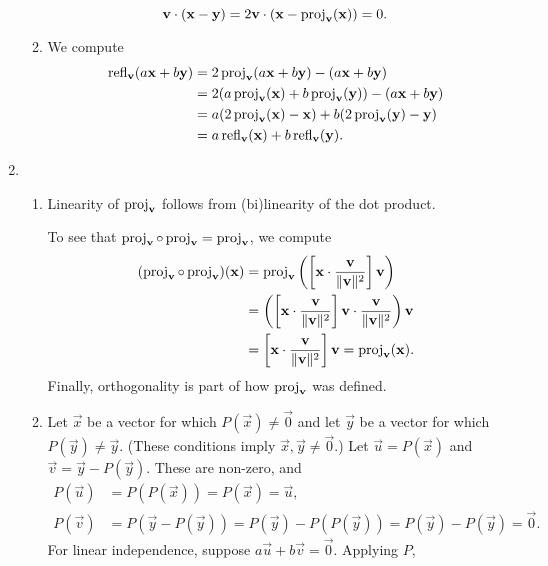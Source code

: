 \begin{enumerate}
\begin{enumerate}
\begin{equation*}
\mathbf{v}\cdot (\mathbf{x} - \mathbf{y}) = 2\mathbf{v}\cdot (\mathbf{x} - \operatorname{proj}_{\mathbf{v}}(\mathbf{x})) = 0.
\end{equation*}
\item We compute
\begin{align*}
\operatorname{refl}_{\mathbf{v}}(a\mathbf{x} + b\mathbf{y}) &= 2\operatorname{proj}_{\mathbf{v}}(a\mathbf{x} + b\mathbf{y}) - (a\mathbf{x} + b\mathbf{y}) \\
&= 2(a\operatorname{proj}_{\mathbf{v}}(\mathbf{x}) + b\operatorname{proj}_{\mathbf{v}}(\mathbf{y})) - (a\mathbf{x} + b\mathbf{y}) \\
&= a(2\operatorname{proj}_{\mathbf{v}}(\mathbf{x}) - \mathbf{x}) + b(2\operatorname{proj}_{\mathbf{v}}(\mathbf{y}) - \mathbf{y}) \\
&= a\operatorname{refl}_{\mathbf{v}}(\mathbf{x}) + b\operatorname{refl}_{\mathbf{v}}(\mathbf{y}).
\end{align*}
\end{enumerate}
\item \begin{enumerate}
\item Linearity of $\operatorname{proj}_{\mathbf{v}}$ follows from (bi)linearity of the dot product.\par
To see that $\operatorname{proj}_{\mathbf{v}}\circ\operatorname{proj}_{\mathbf{v}} = \operatorname{proj}_{\mathbf{v}}$, we compute
\begin{align*}
(\operatorname{proj}_{\mathbf{v}}\circ\operatorname{proj}_{\mathbf{v}})(\mathbf{x}) &= \operatorname{proj}_{\mathbf{v}}\left(\left[\mathbf{x}\cdot\frac{\mathbf{v}}{\|\mathbf{v}\|^2}\right]\mathbf{v}\right) \\
&= \left(\left[\mathbf{x}\cdot\frac{\mathbf{v}}{\|\mathbf{v}\|^2}\right]\mathbf{v}\cdot\frac{\mathbf{v}}{\|\mathbf{v}\|^2}\right)\mathbf{v} \\
&= \left[\mathbf{x}\cdot\frac{\mathbf{v}}{\|\mathbf{v}\|^2}\right]\mathbf{v} = \operatorname{proj}_{\mathbf{v}}(\mathbf{x}).
\end{align*}
Finally, orthogonality is part of how $\operatorname{proj}_{\mathbf{v}}$ was defined.
\item Let $\vec{x}$ be a vector for which $P(\vec{x})\neq\vec{0}$ and let $\vec{y}$ be a vector for which $P(\vec{y})\neq\vec{y}$. (These conditions imply $\vec{x},\vec{y}\neq\vec{0}$.) Let $\vec{u} = P(\vec{x})$ and $\vec{v} = \vec{y} - P(\vec{y})$. These are non-zero, and
\begin{align*}
P(\vec{u}) &= P(P(\vec{x})) = P(\vec{x}) = \vec{u}, \\
P(\vec{v}) &= P(\vec{y} - P(\vec{y})) = P(\vec{y}) - P(P(\vec{y})) = P(\vec{y}) - P(\vec{y}) = \vec{0}.
\end{align*}
For linear independence, suppose $a\vec{u} + b\vec{v} = \vec{0}$. Applying $P$,
\begin{equation*}

\end{equation*}
\end{enumerate}
\end{enumerate}

